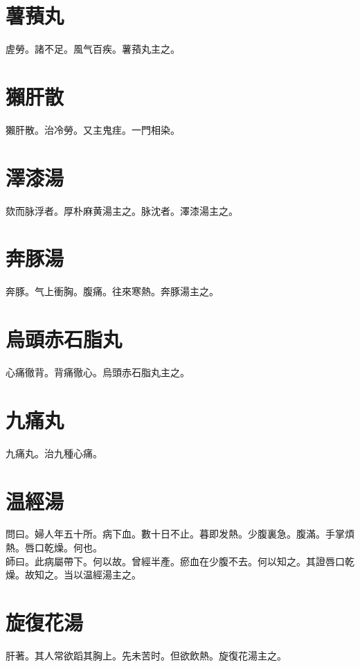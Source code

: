 \documentclass[12pt,twoside,UTF8,b5paper]{ctexbook}
\begin{document}
\section{薯蕷丸}

虗勞。諸不足。風气百疾。薯蕷丸主之。

\section{獺肝散}

獺肝散。治冷勞。又主鬼疰。一門相染。

\section{澤漆湯}

欬而脉浮者。厚朴麻黄湯主之。脉沈者。澤漆湯主之。

\section{奔豚湯}

奔豚。气上衝胸。腹痛。往來寒熱。奔豚湯主之。

\section{烏頭赤石脂丸}

心痛徹背。背痛徹心。烏頭赤石脂丸主之。

\section{九痛丸}

九痛丸。治九種心痛。

\section{温經湯}

問曰。婦人年五十所。病下血。數十日不止。暮即发熱。少腹裏急。腹滿。手掌煩熱。唇口乾燥。何也。\\
師曰。此病屬帶下。何以故。曾經半產。瘀血在少腹不去。何以知之。其證唇口乾燥。故知之。当以温經湯主之。

\section{旋復花湯}

肝著。其人常欲蹈其胸上。先未苦时。但欲飲熱。旋復花湯主之。
\end{document}
